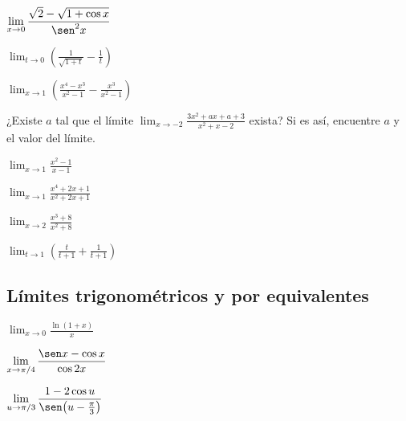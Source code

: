 \begin{prob}
$\displaystyle\lim_{x\to 0}\frac{\sqrt{2}-\sqrt{1+\cos x}}{\sen^2 x}$
\end{prob}

\begin{prob}
$\displaystyle\lim_{t\to 0}\!\left(\frac{1}{\sqrt{1+t}}-\frac{1}{t}\right)$
\end{prob}

\begin{prob}
$\displaystyle\lim_{x\to 1}\!\left(\frac{x^4-x^3}{x^2-1}-\frac{x^3}{x^2-1}\right)$
\end{prob}

\begin{prob}
¿Existe $a$ tal que el límite
$\displaystyle\lim_{x\to -2}\frac{3x^2+ax+a+3}{x^2+x-2}$ exista?
Si es así, encuentre $a$ y el valor del límite.
\end{prob}

\begin{prob}
$\displaystyle\lim_{x\to 1}\frac{x^2-1}{x-1}$
\end{prob}

\begin{prob}
$\displaystyle\lim_{x\to 1}\frac{x^4+2x+1}{x^2+2x+1}$
\end{prob}

\begin{prob}
$\displaystyle\lim_{x\to 2}\frac{x^3+8}{x^2+8}$
\end{prob}

\begin{prob}
$\displaystyle\lim_{t\to 1}\!\left(\frac{t}{t+1}+\frac{1}{t+1}\right)$
\end{prob}

\subsection{Límites trigonométricos y por equivalentes}

\begin{prob}
$\displaystyle\lim_{x\to 0}\frac{\ln(1+x)}{x}$
\end{prob}

\begin{prob}
$\displaystyle\lim_{x\to \pi/4}\frac{\sen x-\cos x}{\cos 2x}$
\end{prob}

\begin{prob}
$\displaystyle\lim_{u\to\pi/3}\frac{1-2\cos u}{\sen\!\left(u-\frac{\pi}{3}\right)}$
\end{prob}

